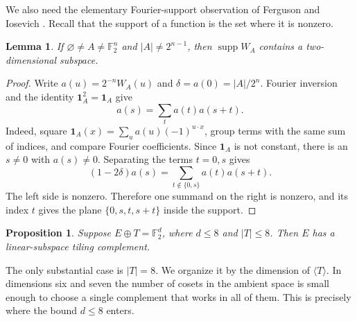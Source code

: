 \documentclass[11pt]{article}
\numberwithin{equation}{section}
\newtheorem{lemma}[theorem]{Lemma}
\newtheorem{proposition}[theorem]{Proposition}
\theoremstyle{definition}
\theoremstyle{remark}\newtheorem{remark}[theorem]{Remark}
\begin{document}
We also need the elementary Fourier-support observation of
Ferguson and Iosevich \cite[Lemma 2.3]{FI}.  Recall that the support
of a function is the set where it is nonzero.

\begin{lemma}\label{lem:support-plane-elementary}
If $\varnothing\ne A\ne\mathbb F_2^n$ and $|A|\ne2^{n-1}$, then
$\operatorname{supp}W_A$ contains a two-dimensional subspace.
\end{lemma}
\begin{proof}
Write $a(u)=2^{-n}W_A(u)$ and $\delta=a(0)=|A|/2^n$.  Fourier inversion
and the identity $\mathbf1_A^2=\mathbf1_A$ give
\[
 a(s)=\sum_t a(t)a(s+t).
\]
Indeed, square $\mathbf1_A(x)=\sum_u a(u)(-1)^{u\cdot x}$, group terms
with the same sum of indices, and compare Fourier coefficients.  Since
$\mathbf1_A$ is not constant, there is an $s\ne0$ with $a(s)\ne0$.
Separating the terms $t=0,s$ gives
\[
 (1-2\delta)a(s)=\sum_{t\notin\{0,s\}}a(t)a(s+t).
\]
The left side is nonzero.  Therefore one summand on the right is nonzero,
and its index $t$ gives the plane $\{0,s,t,s+t\}$ inside the support.
\end{proof}

\begin{proposition}\label{prop:small-partner-elementary}
Suppose $E\oplus T=\mathbb F_2^d$, where $d\le8$ and $|T|\le8$.
Then $E$ has a linear-subspace tiling complement.
\end{proposition}

The only substantial case is $|T|=8$.  We organize it by the dimension of
$\langle T\rangle$.  In dimensions six and seven the number of cosets in
the ambient space is small enough to choose a single complement that
works in all of them.  This is precisely where the bound $d\le8$ enters.
\end{document}
